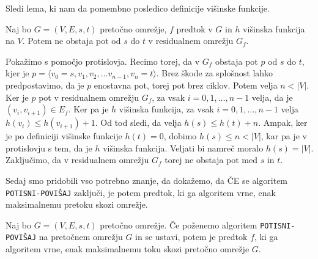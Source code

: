 \documentclass[mat1]{fmfdelo}
\begin{document}
Sledi lema, ki nam da pomembno posledico definicije višinske funkcije.

\begin{lema}\label{lem:ni_poti}
Naj bo $G=(V,E,s,t)$ pretočno omrežje, $f$ predtok v $G$ in $h$ višinska funkcija na $V$. Potem ne obstaja pot od $s$ do $t$ v residualnem omrežju $G_f$.
\end{lema}

\begin{dokaz}
Pokažimo s pomočjo protislovja. Recimo torej, da v $G_f$ obstaja pot $p$ od $s$ do $t$, kjer je $p = \langle v_0 = s, v_1, v_2, \dotsc v_{n-1}, v_n = t\rangle$. Brez škode za splošnost lahko predpostavimo, da je $p$ enostavna pot, torej pot brez ciklov. Potem velja $n < |V|$. Ker je $p$ pot v residualnem omrežju $G_f$, za vsak $i = 0, 1, \dotsc, n-1$ velja, da je $(v_i, v_{i+1}) \in E_f$. Ker pa je $h$ višinska funkcija, za vsak $i = 0, 1, \dotsc, n-1$ velja $h(v_i) \leq h(v_{i+1}) + 1$. Od tod sledi, da velja $h(s) \leq h(t) + n$. Ampak, ker je po definiciji višinske funkcije $h(t) = 0$, dobimo $h(s) \leq n < |V|$, kar pa je v protislovju s tem, da je $h$ višinska funkcija. Veljati bi namreč moralo $h(s) = |V|$. Zaključimo, da v residualnem omrežju $G_f$ torej ne obstaja pot med $s$ in $t$.
\end{dokaz}

Sedaj smo pridobili vso potrebno znanje, da dokažemo, da ČE se algoritem \texttt{POTISNI-POVIŠAJ} zaključi, je potem predtok, ki ga algoritem vrne, enak maksimalnemu pretoku skozi omrežje.

\begin{izrek}
Naj bo $G=(V,E,s,t)$ pretočno omrežje. Če poženemo algoritem \texttt{POTISNI-POVIŠAJ} na pretočnem omrežju $G$ in se ustavi, potem je predtok $f$, ki ga algoritem vrne, enak maksimalnemu toku skozi pretočno omrežje $G$.
\end{izrek}
\end{document}
